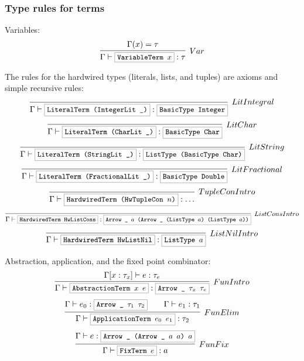 \documentclass[a4paper]{scrartcl}
\newcommand{\hsterm}[1]{%
    \setlength{\fboxsep}{3pt}%
    \setlength{\fboxrule}{0.2pt}%
    \fbox{\texttt{\small #1}}}
\begin{document}
\subsubsection{Type rules for terms}
Variables:
\begin{equation*}
\infer[Var]%
    {\Gamma \vdash \hsterm{VariableTerm \ensuremath{x}} : \tau}
    {\Gamma(x) = \tau}
\end{equation*}

The rules for the hardwired types (literals, lists, and tuples) are axioms
and simple recursive rules:
\begin{equation*}
\infer[LitIntegral]%
    {\Gamma \vdash \hsterm{LiteralTerm (IntegerLit \_)} : \hsterm{BasicType Integer}}%
    {}
\end{equation*}\begin{equation*}
\infer[LitChar]%
    {\Gamma \vdash \hsterm{LiteralTerm (CharLit \_)} : \hsterm{BasicType Char}}%
    {}
\end{equation*}\begin{equation*}
\infer[LitString]%
    {\Gamma \vdash \hsterm{LiteralTerm (StringLit \_)} : \hsterm{ListType (BasicType Char)}}%
    {}
\end{equation*}\begin{equation*}
\infer[LitFractional]%
    {\Gamma \vdash \hsterm{LiteralTerm (FractionalLit \_)} : \hsterm{BasicType Double}}%
    {}
\end{equation*}\begin{equation*}
\infer[TupleConIntro]%
    {\Gamma \vdash \hsterm{HardwiredTerm (HwTupleCon \ensuremath{n})} : \ldots}%
    {}
\end{equation*}\begin{equation*}
\infer[ListConsIntro]%
    {\Gamma \vdash \hsterm{HardwiredTerm HwListCons} : \hsterm{Arrow \_ \ensuremath{a} (Arrow \_ (ListType \ensuremath{a}) (ListType \ensuremath{a}))}}%
    {}
\end{equation*}\begin{equation*}
\infer[ListNilIntro]%
    {\Gamma \vdash \hsterm{HardwiredTerm HwListNil} : \hsterm{ListType \ensuremath{a}}}%
    {}
\end{equation*}

Abstraction, application, and the fixed point combinator:
\begin{equation*}
\infer[FunIntro]%
    {\Gamma \vdash \hsterm{AbstractionTerm \ensuremath{x} \ensuremath{e}} : \hsterm{Arrow \_ \ensuremath{\tau_x} \ensuremath{\tau_e}}}%
    {\Gamma [x : \tau_x] \vdash e : \tau_e}%
\end{equation*}\begin{equation*}
\infer[FunElim]%
    {\Gamma \vdash \hsterm{ApplicationTerm \ensuremath{e_0} \ensuremath{e_1}} : \tau_2}%
    {\Gamma \vdash e_0 : \hsterm{Arrow \_ \ensuremath{\tau_1} \ensuremath{\tau_2}} \qquad \Gamma \vdash e_1 : \tau_1}%
\end{equation*}\begin{equation*}
\infer[FunFix]%
    {\Gamma \vdash \hsterm{FixTerm \ensuremath{e}} : \ensuremath{a}}%
    {\Gamma \vdash \ensuremath{e} : \hsterm{Arrow \_ (Arrow \_ \ensuremath{a} \ensuremath{a}) \ensuremath{a}}}
\end{equation*}
\end{document}
